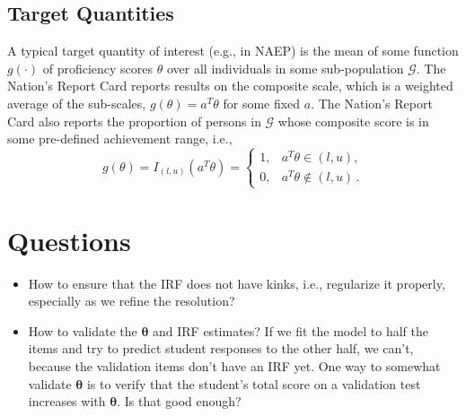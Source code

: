 \documentclass{article}
\newcommand{\bta}{\boldsymbol\ta}
\newcommand{\ta}{\theta}
\newcommand{\G}{\mathcal{G}}
\begin{document}
\subsection{Target Quantities}
A typical target quantity of interest (e.g., in NAEP) is the mean of some function $g(\cdot)$ of proficiency scores $\ta$ over all individuals in some sub-population $\G$. The Nation's Report Card reports results on the composite scale, which is a weighted average of the sub-scales, $g(\ta) = a^T \ta$ for some fixed $a$. The Nation's Report Card also reports the proportion of persons in $\G$ whose composite score is in some pre-defined achievement range, i.e.,
\begin{equation}
	g(\ta) = I_{(l,u)}(a^T \ta) =
  \begin{cases}
    1, & a^T \ta \in (l,u), \\
    0, & a^T \ta \not \in (l,u)\,.
  \end{cases}
\end{equation}

\section{Questions}
\begin{itemize}
	\item How to ensure that the IRF does not have kinks, i.e., regularize it properly, especially as we refine the resolution?
	\item How to validate the $\bta$ and IRF estimates? If we fit the model to half the items and try to predict student responses to the other half, we can't, because the validation items don't have an IRF yet. One way to somewhat validate $\bta$ is to verify that the student's total score on a validation test increases with $\bta$. Is that good enough?
\end{itemize}



\end{document}
